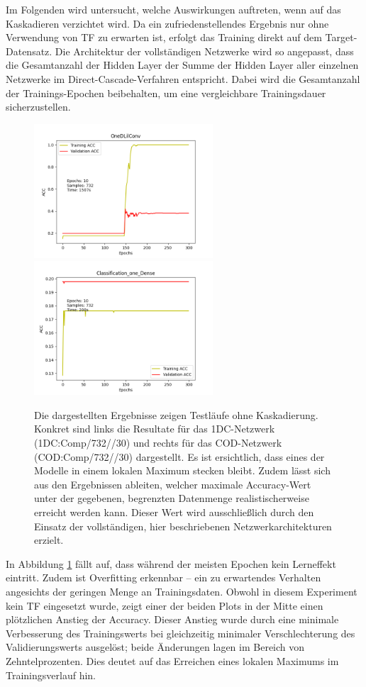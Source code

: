 Im Folgenden wird untersucht, welche Auswirkungen auftreten, wenn auf das Kaskadieren verzichtet wird. Da ein zufriedenstellendes Ergebnis 
nur ohne Verwendung von TF zu erwarten ist, erfolgt das Training direkt auf dem Target-Datensatz. Die Architektur der 
vollständigen Netzwerke wird so angepasst, dass die Gesamtanzahl der Hidden Layer der Summe der Hidden Layer aller einzelnen Netzwerke im 
Direct-Cascade-Verfahren entspricht. Dabei wird die Gesamtanzahl der Trainings-Epochen beibehalten, um eine vergleichbare Trainingsdauer 
sicherzustellen.

\begin{figure}[htpb]
    \includegraphics[height=5cm]{../../Plots/ba_plots/classnocascade/1dc.png}
    \includegraphics[height=5cm]{../../Plots/ba_plots/classnocascade/cod.png}
    \caption{\label{fig:nocascade} 
    \small{Die dargestellten Ergebnisse zeigen Testläufe ohne Kaskadierung. Konkret sind links die Resultate für das 1DC-Netzwerk (1DC:Comp/732//30) 
    und rechts für das COD-Netzwerk (COD:Comp/732//30) dargestellt. Es ist ersichtlich, dass eines der Modelle in einem lokalen Maximum stecken bleibt. 
    Zudem lässt sich aus den Ergebnissen ableiten, welcher maximale Accuracy-Wert unter der gegebenen, begrenzten Datenmenge realistischerweise 
    erreicht werden kann. Dieser Wert wird ausschließlich durch den Einsatz der vollständigen, hier beschriebenen Netzwerkarchitekturen erzielt.}}
\end{figure}

In Abbildung \ref{fig:nocascade} fällt auf, dass während der meisten Epochen kein Lerneffekt eintritt. Zudem ist Overfitting 
erkennbar – ein zu erwartendes Verhalten angesichts der geringen Menge an Trainingsdaten. Obwohl in diesem Experiment kein TF eingesetzt wurde, 
zeigt einer der beiden Plots in der Mitte einen plötzlichen Anstieg der Accuracy. Dieser Anstieg wurde durch eine minimale Verbesserung des 
Trainingswerts bei gleichzeitig minimaler Verschlechterung des Validierungswerts ausgelöst; beide Änderungen lagen im Bereich von 
Zehntelprozenten. Dies deutet auf das Erreichen eines lokalen Maximums im Trainingsverlauf hin.

